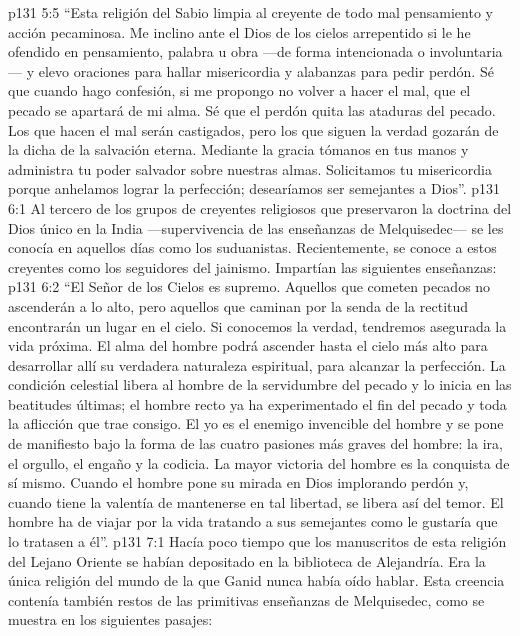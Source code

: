 \vs p131 5:5 “Esta religión del Sabio limpia al creyente de todo mal pensamiento y acción pecaminosa. Me inclino ante el Dios de los cielos arrepentido si le he ofendido en pensamiento, palabra u obra ---de forma intencionada o involuntaria--- y elevo oraciones para hallar misericordia y alabanzas para pedir perdón. Sé que cuando hago confesión, si me propongo no volver a hacer el mal, que el pecado se apartará de mi alma. Sé que el perdón quita las ataduras del pecado. Los que hacen el mal serán castigados, pero los que siguen la verdad gozarán de la dicha de la salvación eterna. Mediante la gracia tómanos en tus manos y administra tu poder salvador sobre nuestras almas. Solicitamos tu misericordia porque anhelamos lograr la perfección; desearíamos ser semejantes a Dios”.
\vs p131 6:1 Al tercero de los grupos de creyentes religiosos que preservaron la doctrina del Dios único en la India ---supervivencia de las enseñanzas de Melquisedec--- se les conocía en aquellos días como los suduanistas. Recientemente, se conoce a estos creyentes como los seguidores del jainismo. Impartían las siguientes enseñanzas:
\vs p131 6:2 \pc “El Señor de los Cielos es supremo. Aquellos que cometen pecados no ascenderán a lo alto, pero aquellos que caminan por la senda de la rectitud encontrarán un lugar en el cielo. Si conocemos la verdad, tendremos asegurada la vida próxima. El alma del hombre podrá ascender hasta el cielo más alto para desarrollar allí su verdadera naturaleza espiritual, para alcanzar la perfección. La condición celestial libera al hombre de la servidumbre del pecado y lo inicia en las beatitudes últimas; el hombre recto ya ha experimentado el fin del pecado y toda la aflicción que trae consigo. El yo es el enemigo invencible del hombre y se pone de manifiesto bajo la forma de las cuatro pasiones más graves del hombre: la ira, el orgullo, el engaño y la codicia. La mayor victoria del hombre es la conquista de sí mismo. Cuando el hombre pone su mirada en Dios implorando perdón y, cuando tiene la valentía de mantenerse en tal libertad, se libera así del temor. El hombre ha de viajar por la vida tratando a sus semejantes como le gustaría que lo tratasen a él”.
\vs p131 7:1 Hacía poco tiempo que los manuscritos de esta religión del Lejano Oriente se habían depositado en la biblioteca de Alejandría. Era la única religión del mundo de la que Ganid nunca había oído hablar. Esta creencia contenía también restos de las primitivas enseñanzas de Melquisedec, como se muestra en los siguientes pasajes:
